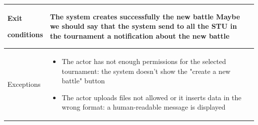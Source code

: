 \begin{center}
\begin{tabular}{| m{2cm} | m{10cm}|}
        Exit \par conditions  & The system creates successfully the new battle    {\color{red} Maybe we should say that the system send to all the STU in the tournament a notification about the new battle}                                                                              \\ \hline
        Exceptions            & \begin{itemize}
                                    \item The actor has not enough permissions for the selected tournament: the system doesn't show the "create a new battle" button
                                    \item The actor uploads files not allowed or it inserts data in the wrong format: a human-readable message is displayed
                                \end{itemize} \\ \hline
    \end{tabular}
\end{center}

